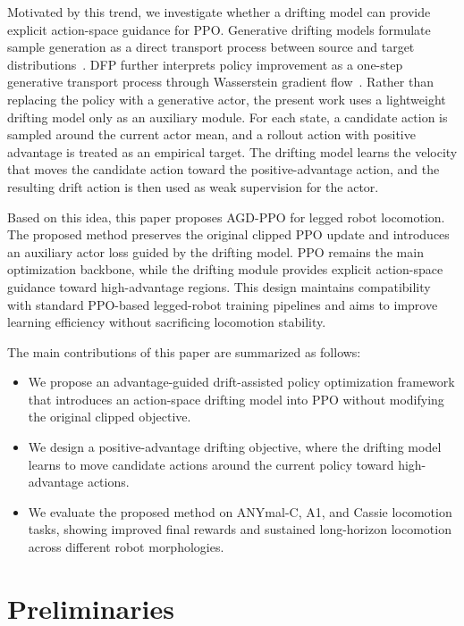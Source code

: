 \documentclass[conference]{IEEEtran}
\begin{document}
Motivated by this trend, we investigate whether a drifting model can provide explicit action-space guidance for PPO. Generative drifting models formulate sample generation as a direct transport process between source and target distributions~\cite{deng2026drifting}. DFP further interprets policy improvement as a one-step generative transport process through Wasserstein gradient flow~\cite{koo2026dfp}. Rather than replacing the policy with a generative actor, the present work uses a lightweight drifting model only as an auxiliary module. For each state, a candidate action is sampled around the current actor mean, and a rollout action with positive advantage is treated as an empirical target. The drifting model learns the velocity that moves the candidate action toward the positive-advantage action, and the resulting drift action is then used as weak supervision for the actor.

Based on this idea, this paper proposes AGD-PPO for legged robot locomotion. The proposed method preserves the original clipped PPO update and introduces an auxiliary actor loss guided by the drifting model. PPO remains the main optimization backbone, while the drifting module provides explicit action-space guidance toward high-advantage regions. This design maintains compatibility with standard PPO-based legged-robot training pipelines and aims to improve learning efficiency without sacrificing locomotion stability.

The main contributions of this paper are summarized as follows:
\begin{itemize}
    \item We propose an advantage-guided drift-assisted policy optimization framework that introduces an action-space drifting model into PPO without modifying the original clipped objective.
    \item We design a positive-advantage drifting objective, where the drifting model learns to move candidate actions around the current policy toward high-advantage actions.
    \item We evaluate the proposed method on ANYmal-C, A1, and Cassie locomotion tasks, showing improved final rewards and sustained long-horizon locomotion across different robot morphologies.
\end{itemize}



\section{Preliminaries}
\label{sec:preliminaries}
\end{document}
